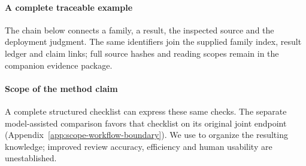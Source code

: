 \paragraph{A complete traceable example}
The chain below connects a family, a result, the inspected source and the deployment judgment. The same identifiers join the supplied family index, result ledger and claim links; full source hashes and reading scopes remain in the companion evidence package.


\paragraph{Scope of the method claim}
A complete structured checklist can express these same checks. The separate model-assisted comparison favors that checklist on its original joint endpoint (Appendix~\ref{app:scope-workflow-boundary}). We use \scope{} to organize the resulting knowledge; improved review accuracy, efficiency and human usability are unestablished.
